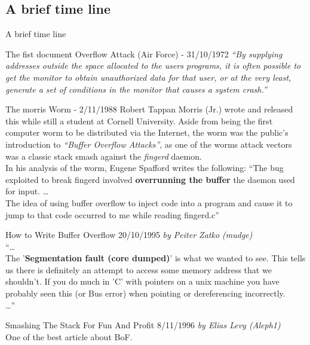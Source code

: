 \subsection{A brief time line}
\begin{frame}{A brief time line}
\begin{block}{The fist document Overflow Attack (Air Force) - 31/10/1972}
\emph{``By supplying addresses outside the space allocated to the users
programs, it is often possible to get the monitor to obtain unauthorized
data for that user, or at the very least, generate a set of conditions in
the monitor that causes a system crash.''}
\end{block}

\framebreak

\begin{block}{The morris Worm - 2/11/1988}
Robert Tappan Morris (Jr.) wrote and released this while still a student at Cornell University. Aside from being the first computer worm to be distributed via the Internet, the worm was the public’s introduction to \emph{``Buffer Overflow Attacks''}, as one of the worms attack vectors was a classic stack smash against the \emph{fingerd} daemon.\\
In his analysis of the worm, Eugene Spafford writes the following: ``The bug exploited to break fingerd involved {\bf overrunning the buffer} the daemon used for input. \ldots \\
The idea of using buffer overflow to inject code into a program and cause it to jump to that code occurred to me while reading fingerd.c''
\end{block}

\framebreak

\begin{block}{How to Write Buffer Overflow 20/10/1995}
\emph{by Peiter Zatko (mudge)}\\
``\ldots \\
    The '{\bf Segmentation fault (core dumped)}' is what we wanted to see. This
    tells us there is definitely an attempt to access some memory address
    that we shouldn't. If you do much in 'C' with pointers on a unix
    machine you have probably seen this (or Bus error) when pointing or
    dereferencing incorrectly.\\
\ldots ''
\end{block}

\begin{block}{Smashing The Stack For Fun And Profit 8/11/1996}
\emph{by Elias Levy (Aleph1)}\\
One of the best article about BoF.
\end{block}

\end{frame}
